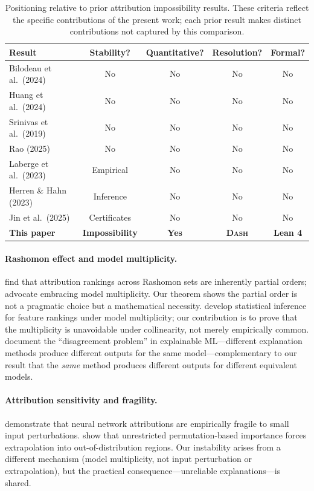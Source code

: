 \documentclass{jmlr}
\newcommand{\DASH}{\textsc{Dash}}
\begin{document}
\begin{table}[t]
\centering
\caption{Positioning relative to prior attribution impossibility results. These criteria reflect the specific contributions of the present work; each prior result makes distinct contributions not captured by this comparison.}
\label{tab:prior-work}
\small
\begin{tabular}{@{}lcccc@{}}
\toprule
Result & Stability? & Quantitative? & Resolution? & Formal? \\
\midrule
Bilodeau et al.\ (2024) & No & No & No & No \\
Huang et al.\ (2024) & No & No & No & No \\
Srinivas et al.\ (2019) & No & No & No & No \\
Rao (2025) & No & No & No & No \\
Laberge et al.\ (2023) & Empirical & No & No & No \\
Herren \& Hahn (2023) & Inference & No & No & No \\
Jin et al.\ (2025) & Certificates & No & No & No \\
\textbf{This paper} & \textbf{Impossibility} & \textbf{Yes} & \textbf{\DASH{}} & \textbf{Lean 4} \\
\bottomrule
\end{tabular}
\end{table}

\paragraph{Rashomon effect and model multiplicity.}
\citet{laberge2023partial} find that attribution rankings across Rashomon sets are inherently partial orders; \citet{rudin2024amazing} advocate embracing model multiplicity.
Our theorem shows the partial order is not a pragmatic choice but a mathematical necessity.
\citet{herren2023statistical} develop statistical inference for feature rankings under model multiplicity; our contribution is to prove that the multiplicity is unavoidable under collinearity, not merely empirically common.
\citet{krishna2022disagreement} document the ``disagreement problem'' in explainable ML---different explanation methods produce different outputs for the same model---complementary to our result that the \emph{same} method produces different outputs for different equivalent models.

\paragraph{Attribution sensitivity and fragility.}
\citet{ghorbani2019data} demonstrate that neural network attributions are empirically fragile to small input perturbations.
\citet{hooker2021unrestricted} show that unrestricted permutation-based importance forces extrapolation into out-of-distribution regions.
Our instability arises from a different mechanism (model multiplicity, not input perturbation or extrapolation), but the practical consequence---unreliable explanations---is shared.
\end{document}
